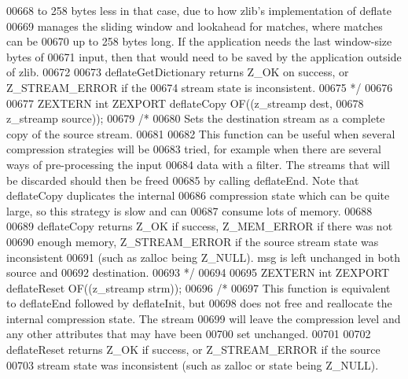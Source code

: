 \begin{DoxyCode}
00668 \textcolor{comment}{   to 258 bytes less in that case, due to how zlib's implementation of deflate}
00669 \textcolor{comment}{   manages the sliding window and lookahead for matches, where matches can be}
00670 \textcolor{comment}{   up to 258 bytes long. If the application needs the last window-size bytes of}
00671 \textcolor{comment}{   input, then that would need to be saved by the application outside of zlib.}
00672 \textcolor{comment}{}
00673 \textcolor{comment}{     deflateGetDictionary returns Z\_OK on success, or Z\_STREAM\_ERROR if the}
00674 \textcolor{comment}{   stream state is inconsistent.}
00675 \textcolor{comment}{*/}
00676 
00677 ZEXTERN \textcolor{keywordtype}{int} ZEXPORT deflateCopy OF((z\_streamp dest,
00678                                     z\_streamp source));
00679 \textcolor{comment}{/*}
00680 \textcolor{comment}{     Sets the destination stream as a complete copy of the source stream.}
00681 \textcolor{comment}{}
00682 \textcolor{comment}{     This function can be useful when several compression strategies will be}
00683 \textcolor{comment}{   tried, for example when there are several ways of pre-processing the input}
00684 \textcolor{comment}{   data with a filter.  The streams that will be discarded should then be freed}
00685 \textcolor{comment}{   by calling deflateEnd.  Note that deflateCopy duplicates the internal}
00686 \textcolor{comment}{   compression state which can be quite large, so this strategy is slow and can}
00687 \textcolor{comment}{   consume lots of memory.}
00688 \textcolor{comment}{}
00689 \textcolor{comment}{     deflateCopy returns Z\_OK if success, Z\_MEM\_ERROR if there was not}
00690 \textcolor{comment}{   enough memory, Z\_STREAM\_ERROR if the source stream state was inconsistent}
00691 \textcolor{comment}{   (such as zalloc being Z\_NULL).  msg is left unchanged in both source and}
00692 \textcolor{comment}{   destination.}
00693 \textcolor{comment}{*/}
00694 
00695 ZEXTERN \textcolor{keywordtype}{int} ZEXPORT deflateReset OF((z\_streamp strm));
00696 \textcolor{comment}{/*}
00697 \textcolor{comment}{     This function is equivalent to deflateEnd followed by deflateInit, but}
00698 \textcolor{comment}{   does not free and reallocate the internal compression state.  The stream}
00699 \textcolor{comment}{   will leave the compression level and any other attributes that may have been}
00700 \textcolor{comment}{   set unchanged.}
00701 \textcolor{comment}{}
00702 \textcolor{comment}{     deflateReset returns Z\_OK if success, or Z\_STREAM\_ERROR if the source}
00703 \textcolor{comment}{   stream state was inconsistent (such as zalloc or state being Z\_NULL).}

\end{DoxyCode}
